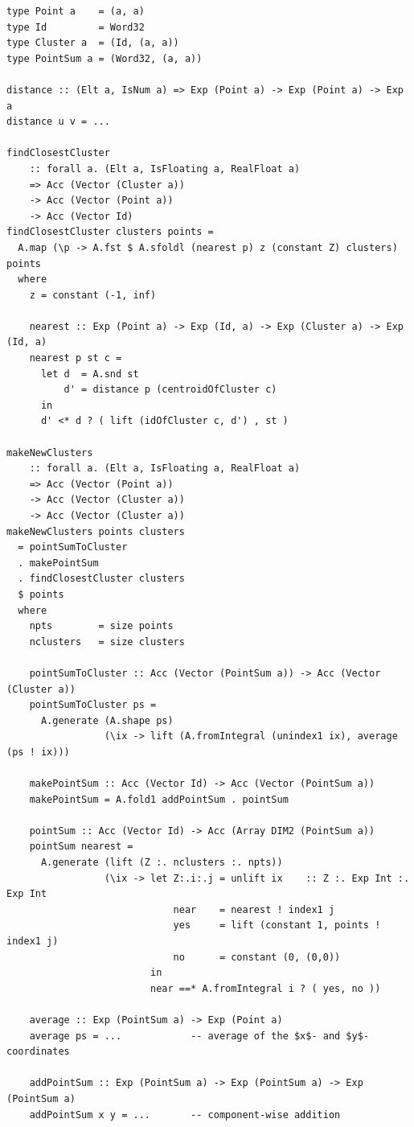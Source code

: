 \begin{lstlisting}[style=haskell_float
    ,label=lst:kmeans
    ,caption={$K$-means clustering for 2D points}]
type Point a    = (a, a)
type Id         = Word32
type Cluster a  = (Id, (a, a))
type PointSum a = (Word32, (a, a))

distance :: (Elt a, IsNum a) => Exp (Point a) -> Exp (Point a) -> Exp a
distance u v = ...

findClosestCluster
    :: forall a. (Elt a, IsFloating a, RealFloat a)
    => Acc (Vector (Cluster a))
    -> Acc (Vector (Point a))
    -> Acc (Vector Id)
findClosestCluster clusters points =
  A.map (\p -> A.fst $ A.sfoldl (nearest p) z (constant Z) clusters) points
  where
    z = constant (-1, inf)

    nearest :: Exp (Point a) -> Exp (Id, a) -> Exp (Cluster a) -> Exp (Id, a)
    nearest p st c =
      let d  = A.snd st
          d' = distance p (centroidOfCluster c)
      in
      d' <* d ? ( lift (idOfCluster c, d') , st )

makeNewClusters
    :: forall a. (Elt a, IsFloating a, RealFloat a)
    => Acc (Vector (Point a))
    -> Acc (Vector (Cluster a))
    -> Acc (Vector (Cluster a))
makeNewClusters points clusters
  = pointSumToCluster
  . makePointSum
  . findClosestCluster clusters
  $ points
  where
    npts        = size points
    nclusters   = size clusters

    pointSumToCluster :: Acc (Vector (PointSum a)) -> Acc (Vector (Cluster a))
    pointSumToCluster ps =
      A.generate (A.shape ps)
                 (\ix -> lift (A.fromIntegral (unindex1 ix), average (ps ! ix)))

    makePointSum :: Acc (Vector Id) -> Acc (Vector (PointSum a))
    makePointSum = A.fold1 addPointSum . pointSum

    pointSum :: Acc (Vector Id) -> Acc (Array DIM2 (PointSum a))
    pointSum nearest =
      A.generate (lift (Z :. nclusters :. npts))
                 (\ix -> let Z:.i:.j = unlift ix    :: Z :. Exp Int :. Exp Int
                             near    = nearest ! index1 j
                             yes     = lift (constant 1, points ! index1 j)
                             no      = constant (0, (0,0))
                         in
                         near ==* A.fromIntegral i ? ( yes, no ))

    average :: Exp (PointSum a) -> Exp (Point a)
    average ps = ...            -- average of the $x$- and $y$-coordinates

    addPointSum :: Exp (PointSum a) -> Exp (PointSum a) -> Exp (PointSum a)
    addPointSum x y = ...       -- component-wise addition
\end{lstlisting}

